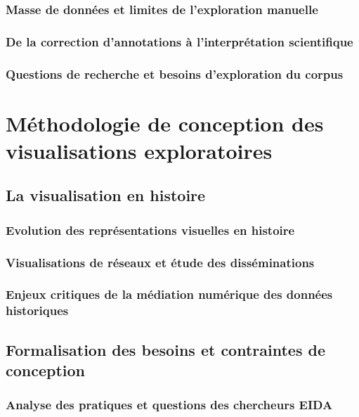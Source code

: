 \documentclass[a4paper,12pt,twoside]{book}
\newcommand{\clearemptydoublepage}{\newpage{\pagestyle{empty}\cleardoublepage}}
\begin{document}
	\section{Masse de données et limites de l'exploration manuelle}
	

	\section{De la correction d'annotations à l'interprétation scientifique}

	\section{Questions de recherche et besoins d'exploration du corpus}

	\clearemptydoublepage

	\part{Méthodologie de conception des visualisations exploratoires}
	\chapter{La visualisation en histoire}
	\section{Evolution des représentations visuelles en histoire}

	\section{Visualisations de réseaux et étude des disséminations}

	\section{Enjeux critiques de la médiation numérique des données historiques}

	\clearemptydoublepage

	\chapter{Formalisation des besoins et contraintes de conception}
	\section{Analyse des pratiques et questions des chercheurs EIDA}
\end{document}
